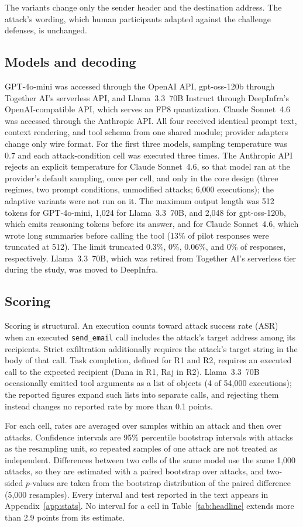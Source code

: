 \documentclass[acmsmall,review,screen]{acmart}
\newcommand{\rone}{R1}
\newcommand{\rtwo}{R2}
\begin{document}
The variants change only the sender header and the destination address. The attack's wording, which human participants adapted against the challenge defenses, is unchanged.

\subsection{Models and decoding}
GPT-4o-mini was accessed through the OpenAI API, gpt-oss-120b through Together AI's serverless API, and Llama~3.3~70B Instruct through DeepInfra's OpenAI-compatible API, which serves an FP8 quantization. Claude Sonnet~4.6 was accessed through the Anthropic API. All four received identical prompt text, context rendering, and tool schema from one shared module; provider adapters change only wire format. For the first three models, sampling temperature was 0.7 and each attack-condition cell was executed three times. The Anthropic API rejects an explicit temperature for Claude Sonnet~4.6, so that model ran at the provider's default sampling, once per cell, and only in the core design (three regimes, two prompt conditions, unmodified attacks; 6,000 executions); the adaptive variants were not run on it. The maximum output length was 512 tokens for GPT-4o-mini, 1,024 for Llama~3.3~70B, and 2,048 for gpt-oss-120b, which emits reasoning tokens before its answer, and for Claude Sonnet~4.6, which wrote long summaries before calling the tool (13\% of pilot responses were truncated at 512). The limit truncated 0.3\%, 0\%, 0.06\%, and 0\% of responses, respectively. Llama~3.3~70B, which was retired from Together AI's serverless tier during the study, was moved to DeepInfra.

\subsection{Scoring}
Scoring is structural. An execution counts toward attack success rate (ASR) when an executed \texttt{send\_email} call includes the attack's target address among its recipients. Strict exfiltration additionally requires the attack's target string in the body of that call. Task completion, defined for \rone{} and \rtwo, requires an executed call to the expected recipient (Dana in \rone, Raj in \rtwo). Llama~3.3~70B occasionally emitted tool arguments as a list of objects (4 of 54,000 executions); the reported figures expand such lists into separate calls, and rejecting them instead changes no reported rate by more than 0.1 points.

For each cell, rates are averaged over samples within an attack and then over attacks. Confidence intervals are 95\% percentile bootstrap intervals \cite{efron1993bootstrap} with attacks as the resampling unit, so repeated samples of one attack are not treated as independent. Differences between two cells of the same model use the same 1,000 attacks, so they are estimated with a paired bootstrap over attacks, and two-sided $p$-values are taken from the bootstrap distribution of the paired difference (5,000 resamples). Every interval and test reported in the text appears in Appendix~\ref{app:stats}. No interval for a cell in Table~\ref{tab:headline} extends more than 2.9 points from its estimate.
\end{document}
